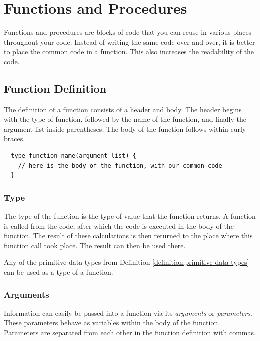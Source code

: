 \documentclass[11pt,fleqn]{book} %
\begin{document}
\chapter{Functions and Procedures}
Functions and procedures are blocks of code that you can reuse in various places throughout your code. Instead of writing the same code over and over, it is better to place the common code in a function. This also increases the readability of the code.

\section{Function Definition}
The definition of a function consists of a header and body. The header begins with the type of function, followed by the name of the function, and finally the argument list inside parentheses. The body of the function follows within curly braces.

\begin{definition}[Function]
	\phantom{ }
	\begin{verbatim}
  type function_name(argument_list) {
    // here is the body of the function, with our common code
  }
	\end{verbatim}
	\vspace{0cm}
\end{definition}
\noindent

\subsection{Type}
The type of the function is the type of value that the function returns. A function is called from the code, after which the code is executed in the body of the function. The result of these calculations is then returned to the place where this function call took place. The result can then be used there.

Any of the primitive data types from Definition \ref{definition:primitive-data-types} can be used as a type of a function.

\pagebreak

\subsection{Arguments}
Information can easily be passed into a function via its \emph{arguments} or \emph{parameters}. These parameters behave as variables within the body of the function. Parameters are separated from each other in the function definition with commas.
\end{document}
